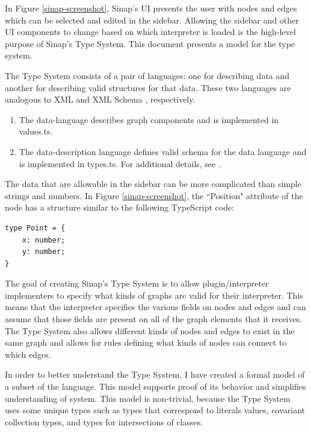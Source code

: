 \documentclass[12pt]{article}
\begin{document}
In Figure \ref{sinap-screenshot}, Sinap's UI
presents the user with nodes and edges which can be selected 
and edited in the sidebar. Allowing the sidebar and other UI components to change based
on which interpreter is loaded is the high-level purpose of Sinap's Type System. 
This document presents a model for the type system. 

The Type System consists of a pair of languages:
one for describing data and another for describing valid structures
for that data. These two languages are analogous to XML and XML Schema
\cite{Thompson:12:WXS}, respectively.

\begin{enumerate}
    \item The data-language describes graph components and is
    implemented in values.ts.
    \item The data-description language defines valid schema 
    for the data language and is implemented in types.ts. 
    For additional details, see \cite{sinap-types-code}.
\end{enumerate}

The data that are allowable in the sidebar can be more complicated than
simple strings and numbers. In Figure \ref{sinap-screenshot}, the ``Position" attribute
of the node has a structure similar to the following TypeScript code:

\vspace{1ex}

\linespread{1}
\begin{verbatim}
type Point = {
    x: number;
    y: number;
}
\end{verbatim}

The goal of creating Sinap's Type System is to allow plugin/interpreter
implementers to specify what 
kinds of graphs are valid for their interpreter. This means that 
the interpreter specifies the various fields on nodes and edges 
and can assume that those fields are present on all of the graph elements
that it receives. The Type System also allows different kinds of nodes and 
edges to exist in the same graph and allows for rules defining what kinds of
nodes can connect to which edges. 

In order to better understand the Type System, I have created a 
formal model of a subset of the language. This model supports proof of
its behavior and simplifies understanding of system. This model 
is non-trivial, because the Type System uses some unique types 
such as types that correspond to literals values,
covariant collection types, and 
types for intersections of classes. 
\end{document}
